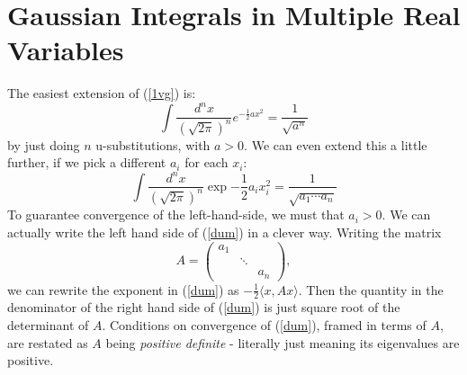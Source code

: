 \documentclass[main.tex]{subfiles}
\begin{document}
\section{Gaussian Integrals in Multiple Real Variables}

The easiest extension of (\ref{1vg}) is:
\[
\int \frac{d^n x}{\left(\sqrt{2\pi}\right)^n} e^{-\frac{1}{2} a x^2 } = \frac{1}{\sqrt{a^n}}
\]
by just doing $n$ u-substitutions, with $a > 0$. We can even extend this a little further, if we pick a different $a_i$ for each $x_i$:
\begin{equation} \label{dum}
\int \frac{d^n x}{\left(\sqrt{2\pi}\right)^n} \exp{-\frac{1}{2} a_i x_i^2} = \frac{1}{\sqrt{a_1 \cdots a_n}}
\end{equation}
To guarantee convergence of the left-hand-side, we must that $a_i > 0$. We can actually write the left hand side of (\ref{dum}) in a clever way. Writing the matrix 
\[
A = \begin{pmatrix}
a_1 & \\
& \ddots \\
& & a_n
\end{pmatrix},
\]
we can rewrite the exponent in (\ref{dum}) as $-\frac{1}{2}\langle x, A x \rangle$. Then the quantity in the denominator of the right hand side of (\ref{dum}) is just square root of the determinant of $A$. Conditions on convergence of (\ref{dum}), framed in terms of $A$, are restated as $A$ being \textit{positive definite} - literally just meaning its eigenvalues are positive. 
\end{document}
